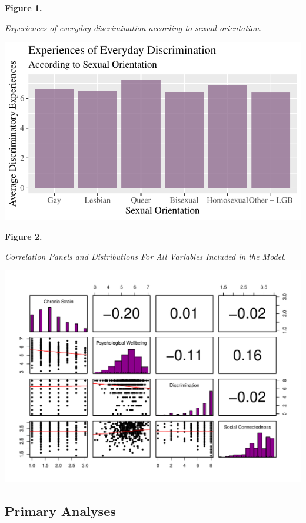\documentclass[
  english,
  man,floatsintext]{apa6}
\begin{document}
\textbf{Figure 1.}

\emph{Experiences of everyday discrimination according to sexual orientation.}

\includegraphics{prep_script_files/figure-latex/meanplot-1.pdf}

\newpage

\textbf{Figure 2.}

\emph{Correlation Panels and Distributions For All Variables Included in the Model.}

\includegraphics{prep_script_files/figure-latex/correlation panels-1.pdf}

\hypertarget{primary-analyses}{%
\subsection{Primary Analyses}\label{primary-analyses}}
\end{document}
